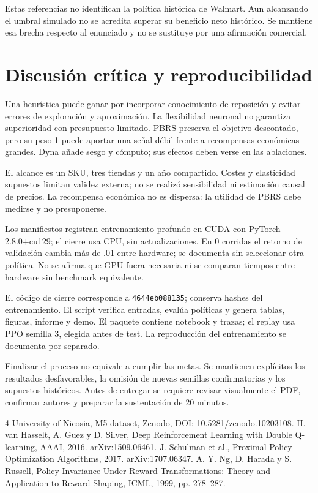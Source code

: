 \documentclass[conference]{IEEEtran}
\begin{document}
Estas referencias no identifican la política histórica de Walmart. Aun alcanzando el umbral simulado no se acredita superar su beneficio neto histórico. Se mantiene esa brecha respecto al enunciado y no se sustituye por una afirmación comercial.

\section{Discusión crítica y reproducibilidad}
Una heurística puede ganar por incorporar conocimiento de reposición y evitar errores de exploración y aproximación. La flexibilidad neuronal no garantiza superioridad con presupuesto limitado. PBRS preserva el objetivo descontado, pero su peso 1 puede aportar una señal débil frente a recompensas económicas grandes. Dyna añade sesgo y cómputo; sus efectos deben verse en las ablaciones.

El alcance es un SKU, tres tiendas y un año compartido. Costes y elasticidad supuestos limitan validez externa; no se realizó sensibilidad ni estimación causal de precios. La recompensa económica no es dispersa: la utilidad de PBRS debe medirse y no presuponerse.

Los manifiestos registran entrenamiento profundo en CUDA con PyTorch 2.8.0+cu129; el cierre usa CPU, sin actualizaciones. En 0 corridas el retorno de validación cambia más de .01 entre hardware; se documenta sin seleccionar otra política. No se afirma que GPU fuera necesaria ni se comparan tiempos entre hardware sin benchmark equivalente.

El código de cierre corresponde a \texttt{4644eb088135}; conserva hashes del entrenamiento. El script verifica entradas, evalúa políticas y genera tablas, figuras, informe y demo. El paquete contiene notebook y trazas; el replay usa PPO semilla 3, elegida antes de test. La reproducción del entrenamiento se documenta por separado.

Finalizar el proceso no equivale a cumplir las metas. Se mantienen explícitos los resultados desfavorables, la omisión de nuevas semillas confirmatorias y los supuestos históricos. Antes de entregar se requiere revisar visualmente el PDF, confirmar autores y preparar la sustentación de 20 minutos.
\begin{thebibliography}{4}
 University of Nicosia, M5 dataset, Zenodo, DOI: 10.5281/zenodo.10203108.
 H. van Hasselt, A. Guez y D. Silver, Deep Reinforcement Learning with Double Q-learning, AAAI, 2016. arXiv:1509.06461.
 J. Schulman et al., Proximal Policy Optimization Algorithms, 2017. arXiv:1707.06347.
 A. Y. Ng, D. Harada y S. Russell, Policy Invariance Under Reward Transformations: Theory and Application to Reward Shaping, ICML, 1999, pp. 278--287.
\end{thebibliography}
\end{document}
